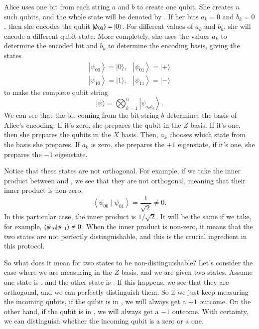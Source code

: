 Alice uses one bit from each string $a$ and $b$ to create one qubit. She creates $n$ such qubits, and the whole state will be denoted by \ket{\psi}. If her bits $a_k = 0$ and $b_k = 0$, then she encodes the qubit $\left| \psi_{00} \right\rangle = \left| 0 \right\rangle$.  For different values of $a_k$ and $b_k$, she will encode a different qubit state.  More completely, she uses the values $a_k$ to determine the encoded bit and $b_k$ to determine the encoding basis, giving the states
\begin{equation}
\begin{array}{ll}
\left|\psi_{00}\right\rangle=|0\rangle, & \left|\psi_{01}\right\rangle=|+\rangle \\
\left|\psi_{10}\right\rangle=|1\rangle, & \left|\psi_{11}\right\rangle=|-\rangle
\end{array}
\end{equation}
to make the complete qubit string
\begin{equation}
|\psi\rangle=\bigotimes_{k=1}^n\left|\psi_{a_k b_k}\right\rangle.
\end{equation}
We can see that the bit coming from the bit string $b$ determines the basis of Alice's encoding. If it's zero, she prepares the qubit in the $Z$ basis. If it's one, then she prepares the qubits in the $X$ basis. Then, $a_k$ chooses which state from the basis she prepares. If $a_k$ is zero, she prepares the $+1$ eigenstate, if it's one, she prepares the $-1$ eigenstate.

Notice that these states are not orthogonal. For example, if we take the inner product between  and , we see that they are not orthogonal, meaning that their inner product is non-zero,
\begin{equation}
\left\langle\psi_{00} \mid \psi_{01}\right\rangle=\frac{1}{\sqrt{2}} \ne 0.
\end{equation}
In this particular case, the inner product is $1/\sqrt{2}$. It will be the same if we take, for example, 
$\langle \psi_{10}|\psi_{11} \rangle \ne 0$. When the inner product is non-zero, it means that the two states are not perfectly distinguishable, and this is the crucial ingredient in this protocol. 

So what does it mean for two states to be non-distinguishable? Let's consider the case where we are measuring in the $Z$ basis, and we are given two states. Assume one state is , and the other state is . If this happens, we see that they are orthogonal, and we can perfectly distinguish them. So if we just keep measuring the incoming qubits, if the qubit is in , we will always get a $+1$ outcome. On the other hand, if the qubit is in , we will always get a $-1$ outcome. With certainty, we can distinguish whether the incoming qubit is a zero or a one.

